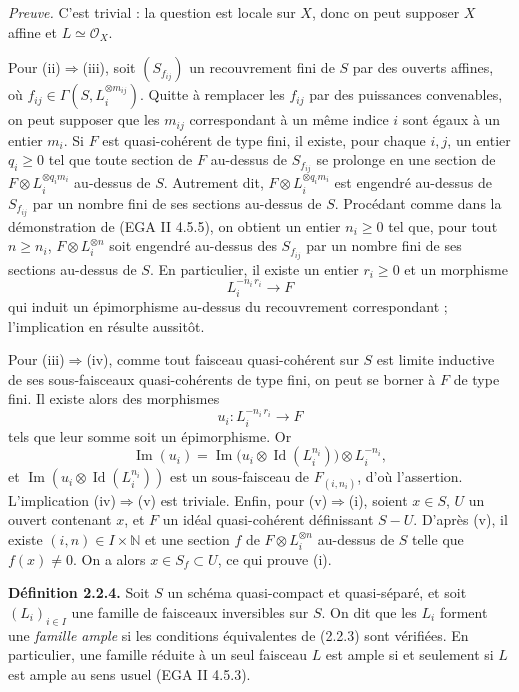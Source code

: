 \documentclass[11pt]{article}
\begin{document}
\emph{Preuve.} C'est trivial : la question est locale sur $X$, donc on peut supposer $X$ affine et $L\simeq\mathcal O_X$.

Pour (ii)$\Rightarrow$(iii), soit $(S_{f_{ij}})$ un recouvrement fini de $S$ par des ouverts affines, où $f_{ij}\in\Gamma(S,L_i^{\otimes m_{ij}})$. Quitte à remplacer les $f_{ij}$ par des puissances convenables, on peut supposer que les $m_{ij}$ correspondant à un même indice $i$ sont égaux à un entier $m_i$. Si $F$ est quasi-cohérent de type fini, il existe, pour chaque $i,j$, un entier $q_i\ge0$ tel que toute section de $F$ au-dessus de $S_{f_{ij}}$ se prolonge en une section de $F\otimes L_i^{\otimes q_im_i}$ au-dessus de $S$. Autrement dit, $F\otimes L_i^{\otimes q_im_i}$ est engendré au-dessus de $S_{f_{ij}}$ par un nombre fini de ses sections au-dessus de $S$. Procédant comme dans la démonstration de (EGA II 4.5.5), on obtient un entier $n_i\ge0$ tel que, pour tout $n\ge n_i$, $F\otimes L_i^{\otimes n}$ soit engendré au-dessus des $S_{f_{ij}}$ par un nombre fini de ses sections au-dessus de $S$. En particulier, il existe un entier $r_i\ge0$ et un morphisme
\[
L_i^{-n_i\, r_i}\longrightarrow F
\]
qui induit un épimorphisme au-dessus du recouvrement correspondant ; l'implication en résulte aussitôt.

Pour (iii)$\Rightarrow$(iv), comme tout faisceau quasi-cohérent sur $S$ est limite inductive de ses sous-faisceaux quasi-cohérents de type fini, on peut se borner à $F$ de type fini. Il existe alors des morphismes
\[
u_i:L_i^{-n_i\, r_i}\longrightarrow F
\]
tels que leur somme soit un épimorphisme. Or
\[
\operatorname{Im}(u_i)=\operatorname{Im}\bigl(u_i\otimes\operatorname{Id}(L_i^{n_i})\bigr)\otimes L_i^{-n_i},
\]
et $\operatorname{Im}(u_i\otimes\operatorname{Id}(L_i^{n_i}))$ est un sous-faisceau de $F_{(i,n_i)}$, d'où l'assertion. L'implication (iv)$\Rightarrow$(v) est triviale. Enfin, pour (v)$\Rightarrow$(i), soient $x\in S$, $U$ un ouvert contenant $x$, et $F$ un idéal quasi-cohérent définissant $S-U$. D'après (v), il existe $(i,n)\in I\times\mathbb N$ et une section $f$ de $F\otimes L_i^{\otimes n}$ au-dessus de $S$ telle que $f(x)\ne0$. On a alors $x\in S_f\subset U$, ce qui prouve (i).

\textbf{Définition 2.2.4.} Soit $S$ un schéma quasi-compact et quasi-séparé, et soit $(L_i)_{i\in I}$ une famille de faisceaux inversibles sur $S$. On dit que les $L_i$ forment une \emph{famille ample} si les conditions équivalentes de (2.2.3) sont vérifiées. En particulier, une famille réduite à un seul faisceau $L$ est ample si et seulement si $L$ est ample au sens usuel (EGA II 4.5.3).
\end{document}
